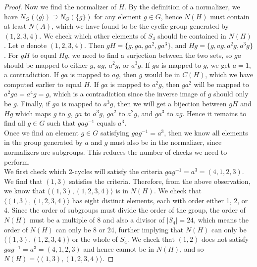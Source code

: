 \documentclass{article}
\begin{document}
\begin{enumerate}
\begin{enumerate}
\begin{proof}
          Now we find the normalizer of $H$. By the definition of a
          normalizer, we have $N_G(\langle g\rangle)\supseteq N_G(\{g\})$
          for any element $g\in G$, hence $N(H)$ must contain at least
          $N(A)$, which we have found to be the cyclic group generated by
          $(1,2,3,4)$. We check which other elements of $S_4$ should be
          contained in $N(H)$. Let $a$ denote $(1,2,3,4)$. Then
          $gH=\{g,ga,ga^2,ga^3\}$, and $Hg=\{g,ag,a^2g,a^3g\}$. For $gH$
          to equal $Hg$, we need to find a surjection between the two
          sets, so $ga$ should be mapped to either $g$, $ag$, $a^2g$, or
          $a^3g$. If $ga$ is mapped to $g$, we get $a=1$, a
          contradiction. If $ga$ is mapped to $ag$, then $g$ would be in
          $C(H)$, which we have computed earlier to equal $H$. If $ga$ is
          mapped to $a^2g$, then $ga^2$ will be mapped to $a^2ga=a^4g=g$,
          which is a contradiction since the inverse image of $g$ should
          only be $g$. Finally, if $ga$ is mapped to $a^3g$, then we will
          get a bijection between $gH$ and $Hg$ which maps $g$ to $g$,
          $ga$ to $a^3g$, $ga^2$ to $a^2g$, and $ga^3$ to $ag$. Hence it
          remains to find all $g\in G$ such that $gag^{-1}$ equals $a^3$.
          \\

          Once we find an element $g\in G$ satisfying $gag^{-1}=a^3$, then
          we know all elements in the group generated by $a$ and $g$ must
          also be in the normalizer, since normalizers are subgroups. This
          reduces the number of checks we need to perform. \\

          We first check which 2-cycles will satisfy the criteria
          $gag^{-1}=a^3=(4,1,2,3)$. We find that $(1,3)$ satisfies the
          criteria. Therefore, from the above observation, we know that
          $\langle(1,3),(1,2,3,4)\rangle$ is in $N(H)$. We check that
          $\langle(1,3),(1,2,3,4)\rangle$ has eight distinct elements, each
          with order either 1, 2, or 4. Since the order of subgroups must
          divide the order of the group, the order of $N(H)$ must be a
          multiple of 8 and also a divisor of $|S_4|=24$, which means the
          order of $N(H)$ can only be 8 or 24, further implying that $N(H)$
          can only be $\langle(1,3),(1,2,3,4)\rangle$ or the whole of
          $S_4$. We check that $(1,2)$ does not satisfy
          $gag^{-1}=a^3=(4,1,2,3)$ and hence cannot be in $N(H)$, and so
          $N(H)=\langle(1,3),(1,2,3,4)\rangle$.
        \end{proof}
    \end{enumerate}


\end{enumerate}
\end{document}
